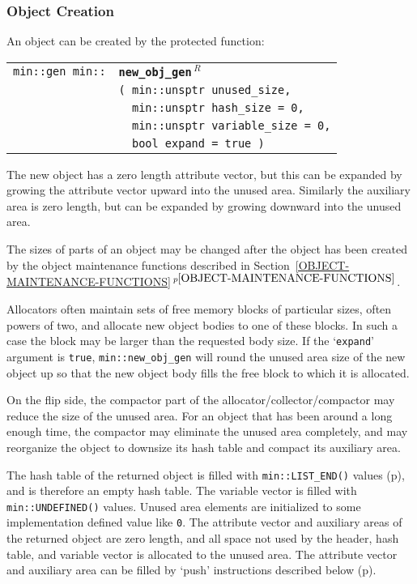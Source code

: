 \documentclass[12pt]{article}
\makeatletter
\newcommand{\TT}[1]{{\tt \bfseries #1}}
\newcommand{\ttindex}[1]{\index{#1@{\tt #1}}}
\newcommand{\itemref}[1]{\ref{#1}$\,^{p\pageref{#1}}$}
\newcommand{\pagref}[1]{p\pageref{#1}}
\newcommand{\EOL}{\penalty \exhyphenpenalty}
\newenvironment{indpar}[1][0.3in]%
	{\begin{list}{}%
		     {\setlength{\itemsep}{0in}%
		      \setlength{\topsep}{0in}%
		      \setlength{\parsep}{1ex}%
		      \setlength{\labelwidth}{#1}%
		      \setlength{\leftmargin}{#1}%
		      \addtolength{\leftmargin}{\labelsep}}%
	 \item}%
	{\end{list}}
\newcommand{\LABEL}[1]{\label{#1}}
\newlength{\ARGBREAKLENGTH}
\newcommand{\ARGBREAK}[1][\ARGBREAKLENGTH]{\\&\hspace*{#1}}
\newcommand{\MINKEY}[1]%
	   {\TT{#1}\ttindex{min::#1}\ttindex{#1}}
\newcommand{\REL}{$\,^R$}
\makeatother
\begin{document}
\subsubsection{Object Creation}
\label{OBJECT-CREATION}

An object can be created by the protected function:

\begin{indpar}\begin{tabular}{r@{}l}
\verb|min::gen min::| & \MINKEY{new\_obj\_gen\REL}\ARGBREAK
    \verb|( min::unsptr unused_size,|\ARGBREAK
    \verb|  min::unsptr hash_size = 0,|\ARGBREAK
    \verb|  min::unsptr variable_size = 0,|\ARGBREAK
    \verb|  bool expand = true )|
\LABEL{MIN::NEW_OBJ_GEN} \\
\end{tabular}\end{indpar}

The new object has a zero length attribute vector, but this can be
expanded by growing the attribute vector upward into the unused area.
Similarly the auxiliary area is zero length, but can be expanded by
growing downward into the unused area.

The sizes of parts of an object may be changed after the object has
been created by the object maintenance functions
described in Section~\itemref{OBJECT-MAINTENANCE-FUNCTIONS}.

Allocators often maintain sets of free memory blocks of particular
sizes, often powers of two, and allocate new object bodies to one
of these blocks.  In such a case the block may be larger than the
requested body size.  If the `{\tt expand}' argument is {\tt true},
{\tt min::\EOL new\_\EOL obj\_\EOL gen} will round the unused area
size of the new object up so that the new object body fills the
free block to which it is allocated.

On the flip side, the compactor part of the
allocator/\EOL collector/\EOL compactor
may reduce the size of the unused
area.  For an object that has been around a long enough time, the
compactor may eliminate the unused area completely, and may reorganize
the object to downsize its hash table and compact its auxiliary area.

The hash table of the returned object is filled with \verb|min::LIST_END()|
values (\pagref{MIN::LIST_END}), and is therefore an empty hash table.
The variable vector is filled with \verb|min::UNDEFINED()| values.
Unused area elements are initialized to some implementation defined
value like \verb|0|.
The attribute vector and auxiliary areas of the returned object are
zero length, and all space not used by the header, hash table, and
variable vector is allocated to the unused area.
The attribute vector and auxiliary area can be
filled by `push' instructions described below
(\pagref{OBJECT_PUSH_FUNCTIONS}).
\end{document}
